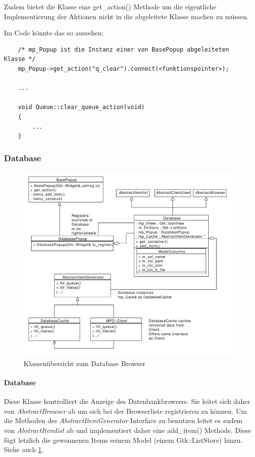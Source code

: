 Zudem bietet die Klasse eine get\_action() Methode um die eigentliche Implementierung der Aktionen nicht in die abgeleitete Klasse machen zu müssen. 

Im Code könnte das so aussehen:
\begin{verbatim}
    /* mp_Popup ist die Instanz einer von BasePopup abgeleiteten Klasse */
    mp_Popup->get_action("q_clear").connect(<funktionspointer>);

    ...

    void Queue::clear_queue_action(void)
    {
        ...
    }
\end{verbatim}


\subsubsection{Database}
\begin{figure}[htb!]
	\centering
        \includegraphics[width=\textwidth]{DatabaseClass.pdf}
	\caption{Klassenübersicht zum Database Browser}
	\label{st_database}
\end{figure}
\paragraph{Database}
Diese Klasse kontrolliert die Anzeige des Datenbankbrowsers. Sie leitet sich daher von \emph{AbstractBrowser} ab um sich bei der Browserliste registrieren zu können.
Um die Methoden des \emph{AbstractItemGenerator} Interface zu benutzen leitet es zudem von \emph{AbstractItemlist} ab und implementiert daher eine add\_item() Methode. 
Diese fügt letzlich die gewonnenen Items seinem Model (einem Gtk::ListStore) hinzu.
Siehe auch \ref{st_database}.
\newpage

